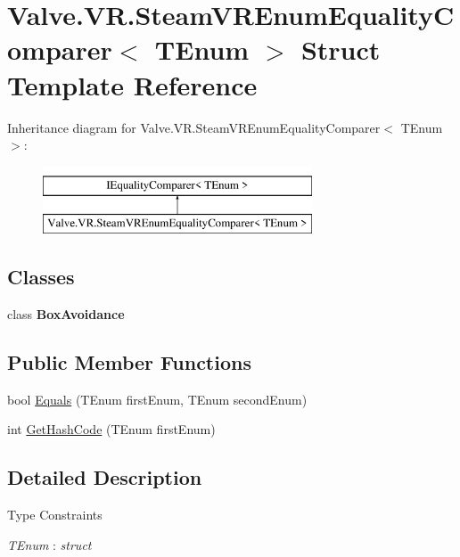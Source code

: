 \hypertarget{struct_valve_1_1_v_r_1_1_steam_v_r_enum_equality_comparer}{}\section{Valve.\+V\+R.\+Steam\+V\+R\+Enum\+Equality\+Comparer$<$ T\+Enum $>$ Struct Template Reference}
\label{struct_valve_1_1_v_r_1_1_steam_v_r_enum_equality_comparer}
Inheritance diagram for Valve.\+V\+R.\+Steam\+V\+R\+Enum\+Equality\+Comparer$<$ T\+Enum $>$\+:\begin{figure}[H]
\begin{center}
\leavevmode
\includegraphics[height=2.000000cm]{struct_valve_1_1_v_r_1_1_steam_v_r_enum_equality_comparer}
\end{center}
\end{figure}
\subsection*{Classes}
\begin{DoxyCompactItemize}
\item 
class {\bfseries Box\+Avoidance}
\end{DoxyCompactItemize}
\subsection*{Public Member Functions}
\begin{DoxyCompactItemize}
\item 
bool \mbox{\hyperlink{struct_valve_1_1_v_r_1_1_steam_v_r_enum_equality_comparer_ab8c7ca0dd56dc1ee1349453a31b954b8}{Equals}} (T\+Enum first\+Enum, T\+Enum second\+Enum)
\item 
int \mbox{\hyperlink{struct_valve_1_1_v_r_1_1_steam_v_r_enum_equality_comparer_a0f820207fa8645ff926fd05fb6d7ecd4}{Get\+Hash\+Code}} (T\+Enum first\+Enum)
\end{DoxyCompactItemize}


\subsection{Detailed Description}
\begin{Desc}
\item[Type Constraints]\begin{description}
\item[{\em T\+Enum} : {\em struct}]\end{description}
\end{Desc}


